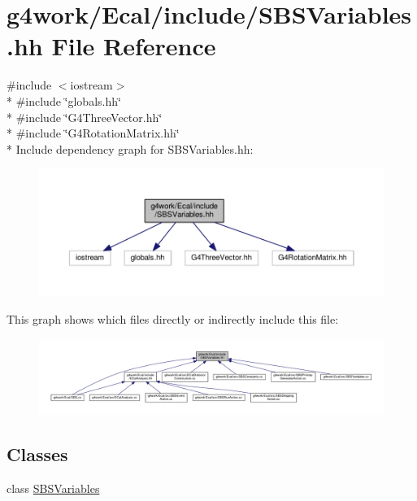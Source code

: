 \hypertarget{_s_b_s_variables_8hh}{\section{g4work/\-Ecal/include/\-S\-B\-S\-Variables.hh File Reference}
\label{_s_b_s_variables_8hh}
}
{\ttfamily \#include $<$iostream$>$}\\*
{\ttfamily \#include \char`\"{}globals.\-hh\char`\"{}}\\*
{\ttfamily \#include \char`\"{}G4\-Three\-Vector.\-hh\char`\"{}}\\*
{\ttfamily \#include \char`\"{}G4\-Rotation\-Matrix.\-hh\char`\"{}}\\*
Include dependency graph for S\-B\-S\-Variables.\-hh\-:\nopagebreak
\begin{figure}[H]
\begin{center}
\leavevmode
\includegraphics[width=350pt]{_s_b_s_variables_8hh__incl}
\end{center}
\end{figure}
This graph shows which files directly or indirectly include this file\-:\nopagebreak
\begin{figure}[H]
\begin{center}
\leavevmode
\includegraphics[width=350pt]{_s_b_s_variables_8hh__dep__incl}
\end{center}
\end{figure}
\subsection*{Classes}
\begin{DoxyCompactItemize}
\item 
class \hyperlink{class_s_b_s_variables}{S\-B\-S\-Variables}
\end{DoxyCompactItemize}
